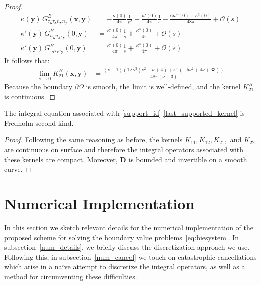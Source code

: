 \documentclass[preprint,12pt,3p]{elsarticle}
\begin{document}
\begin{proof}
\begin{align}
        \kappa(\mathbf{y}) \, G^B_{\tau_\mathbf{x} \tau_\mathbf{x} n_\mathbf{y} n_\mathbf{y}} (\mathbf{x}, \mathbf{y}) &=  -\frac{\kappa(0)}{4 \pi  }\frac{1}{s^2}-\frac{\kappa'(0)}{4 \pi }\frac{1}{s} -\frac{6\kappa''(0) - \kappa^3(0)}{48 \pi } + \mathcal{O}(s) \\
        \kappa'(\mathbf{y}) \, G^B_{n_{\mathbf{x}} n_\mathbf{x} \tau_\mathbf{y}} (0, \mathbf{y}) &=  \frac{\kappa'(0)}{4 \pi  }\frac{1}{s} + \frac{\kappa''(0)}{4 \pi } + \mathcal{O}(s)  \\
        \kappa'(\mathbf{y}) \, G^B_{\tau_{\mathbf{x}} \tau_\mathbf{x} \tau_\mathbf{y}} (0, \mathbf{y}) &=  \frac{\kappa'(0)}{4 \pi  }\frac{1}{s} + \frac{\kappa''(0)}{4 \pi } + \mathcal{O}(s)
    \end{align} 
It follows that:
\begin{align}
    \lim_{s \rightarrow 0} K^B_{21}(\mathbf{x}, \mathbf{y}) &=  \frac{(\nu-1) \left(12 \kappa^3 \left(\nu^2-\nu+4\right)+\kappa'' \left(-5 \nu^2+4 \nu+33\right)\right)}{48 \pi  (\nu-3)}
\end{align}
Because the boundary $\partial \Omega$ is smooth, the limit is well-defined, and the kernel $K^B_{21}$ is continuous. 
\end{proof}


\begin{cor}
    The integral equation associated with \eqref{support_id}-\eqref{last_supported_kernel} is Fredholm second kind. 
\end{cor}

\begin{proof}
    Following the same reasoning as before, the kernels $K_{11}, K_{12}, K_{21},$ and $K_{22}$ are continuous on surface and therefore the integral operators associated with these kernels are compact. Moreover, $\mathbf{D}$ is bounded and invertible on
    a smooth curve.
\end{proof}

\section{Numerical Implementation}\label{num_imp}

In this section we sketch relevant details for the numerical implementation of the proposed scheme
for solving the boundary value problems~\eqref{eq:biesystem}. In subsection~\ref{num_details}, we briefly discuss the discretization approach we use. Following this, in subsection~\ref{num_cancel} we touch on catastrophic cancellations which arise in a na\"{i}ve attempt to discretize the integral operators, as well as a method for circumventing these difficulties.
\end{document}
